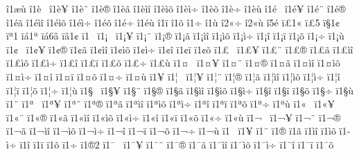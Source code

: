 {^^ee1^^e6^^f9
^^ee1^^e8^^a0
^^ee1^^e8^^a5
^^ee1^^e8^^a8
^^ee1^^e8^^ae
^^ee1^^e8^^e3
^^ee1^^e8^^ec^^ee
^^ee1^^e8^^ec^^f5
^^ee1^^e8^^ec^^f7
^^ee1^^e8^^f5
^^ee1^^e8^^f7
^^ee1^^e8^^f9
^^ee1^^e9^^a0
^^ee1^^e9^^a5
^^ee1^^e9^^a8
^^ee1^^e9^^ae
^^ee1^^e9^^e3
^^ee1^^e9^^ec^^ee
^^ee1^^e9^^ec^^f5
^^ee1^^e9^^ec^^f7
^^ee1^^e9^^f5
^^ee1^^e9^^f7
^^ee1^^e9^^f9
^^ee1^^ef
^^ee1^^f5
^^ee1^^f7
^^ee1^^f9
^^ee2^^ab^^f7
^^ee2^^ab^^f9
^^ee5^^e9
^^ef^^a31^^ab
^^ef^^a35^^ad
^^ef^^a71^^a2
^^ef^^aa1^^ad
^^ef^^e11^^aa
^^ef^^e16^^e2
^^ef^^e21^^a2
^^ef1^^a0
^^ef1^^a1^^a0
^^ef1^^a1^^a5
^^ef1^^a1^^a8
^^ef1^^a1^^ae
^^ef1^^a1^^e3
^^ef1^^a1^^ec^^ee
^^ef1^^a1^^ec^^f5
^^ef1^^a1^^ec^^f7
^^ef1^^a1^^ee
^^ef1^^a1^^ef
^^ef1^^a1^^f5
^^ef1^^a1^^f7
^^ef1^^a1^^f9
^^ef1^^a2^^a0
^^ef1^^a2^^a5
^^ef1^^a2^^ae
^^ef1^^a2^^e3
^^ef1^^a2^^ec^^ee
^^ef1^^a2^^ec^^f5
^^ef1^^a2^^ec^^f7
^^ef1^^a2^^ee
^^ef1^^a2^^ef
^^ef1^^a2^^f5
^^ef1^^a3^^a0
^^ef1^^a3^^a5
^^ef1^^a3^^a8
^^ef1^^a3^^ae
^^ef1^^a3^^e3
^^ef1^^a3^^ec^^ee
^^ef1^^a3^^ec^^f5
^^ef1^^a3^^ec^^f7
^^ef1^^a3^^ee
^^ef1^^a3^^ef
^^ef1^^a3^^f5
^^ef1^^a3^^f7
^^ef1^^a3^^f9
^^ef1^^a4^^a0
^^ef1^^a4^^a5
^^ef1^^a4^^a8
^^ef1^^a4^^ae
^^ef1^^a4^^e3
^^ef1^^a4^^ec^^ee
^^ef1^^a4^^ec^^f5
^^ef1^^a4^^ec^^f7
^^ef1^^a4^^ee
^^ef1^^a4^^ef
^^ef1^^a4^^f5
^^ef1^^a4^^f7
^^ef1^^a4^^f9
^^ef1^^a5
^^ef1^^a6^^a0
^^ef1^^a6^^a5
^^ef1^^a6^^a8
^^ef1^^a6^^ae
^^ef1^^a6^^e3
^^ef1^^a6^^ec^^ee
^^ef1^^a6^^ec^^f5
^^ef1^^a6^^ec^^f7
^^ef1^^a6^^ee
^^ef1^^a6^^ef
^^ef1^^a6^^f5
^^ef1^^a6^^f7
^^ef1^^a6^^f9
^^ef1^^a7^^a0
^^ef1^^a7^^a5
^^ef1^^a7^^a8
^^ef1^^a7^^ae
^^ef1^^a7^^e3
^^ef1^^a7^^ec^^ee
^^ef1^^a7^^ec^^f5
^^ef1^^a7^^ec^^f7
^^ef1^^a7^^ee
^^ef1^^a7^^ef
^^ef1^^a7^^f5
^^ef1^^a7^^f7
^^ef1^^a7^^f9
^^ef1^^a8
^^ef1^^aa^^a0
^^ef1^^aa^^a5
^^ef1^^aa^^a8
^^ef1^^aa^^ae
^^ef1^^aa^^e3
^^ef1^^aa^^ec^^ee
^^ef1^^aa^^ec^^f5
^^ef1^^aa^^ec^^f7
^^ef1^^aa^^ee
^^ef1^^aa^^ef
^^ef1^^aa^^f5
^^ef1^^aa^^f7
^^ef1^^aa^^f9
^^ef1^^ab^^a0
^^ef1^^ab^^a5
^^ef1^^ab^^a8
^^ef1^^ab^^ae
^^ef1^^ab^^e3
^^ef1^^ab^^ec^^ee
^^ef1^^ab^^ec^^f5
^^ef1^^ab^^ec^^f7
^^ef1^^ab^^ee
^^ef1^^ab^^ef
^^ef1^^ab^^f5
^^ef1^^ab^^f7
^^ef1^^ab^^f9
^^ef1^^ac^^a0
^^ef1^^ac^^a5
^^ef1^^ac^^a8
^^ef1^^ac^^ae
^^ef1^^ac^^e3
^^ef1^^ac^^ec^^ee
^^ef1^^ac^^ec^^f5
^^ef1^^ac^^ec^^f7
^^ef1^^ac^^ee
^^ef1^^ac^^ef
^^ef1^^ac^^f5
^^ef1^^ac^^f7
^^ef1^^ac^^f9
^^ef1^^ad^^a0
^^ef1^^ad^^a5
^^ef1^^ad^^a8
^^ef1^^ad^^ae
^^ef1^^ad^^e3
^^ef1^^ad^^ec^^ee
^^ef1^^ad^^ec^^f5
^^ef1^^ad^^ec^^f7
^^ef1^^ad^^ee
^^ef1^^ad^^ef
^^ef1^^ad^^f5
^^ef1^^ad^^f7
^^ef1^^ae2
^^ef1^^af^^a0
^^ef1^^af^^a5
^^ef1^^af^^a8
^^ef1^^af^^ae
^^ef1^^af^^e3
^^ef1^^af^^ec^^ee
^^ef1^^af^^ec^^f5
^^ef1^^af^^ec^^f7
^^ef1^^af^^ee
^^ef1^^af^^ef
^^ef1^^af^^f5
}
